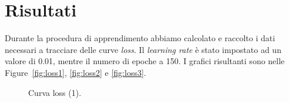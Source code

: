 \documentclass[a4paper,12pt]{article}
\begin{document}
\newpage
\section{Risultati} %

Durante la procedura di apprendimento abbiamo calcolato e raccolto i dati necessari a tracciare delle curve \emph{loss}. Il \emph{learning rate} è stato impostato ad un valore di 0.01, mentre il numero di epoche a 150. I grafici risultanti sono nelle Figure~\vref{fig:loss1}, \vref{fig:loss2} e \vref{fig:loss3}.

\begin{figure}[htb]
  \center
  \caption{Curva loss (1).}
  \label{fig:loss1}
\end{figure}
\end{document}
